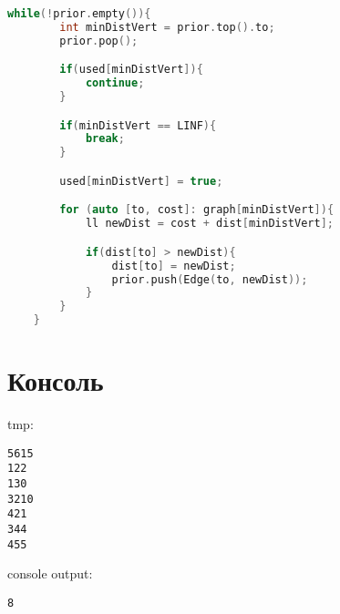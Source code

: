 \begin{lstlisting}[language=C++]
    while(!prior.empty()){
        int minDistVert = prior.top().to;
        prior.pop();

        if(used[minDistVert]){
            continue;
        }

        if(minDistVert == LINF){
            break;
        }        

        used[minDistVert] = true;

        for (auto [to, cost]: graph[minDistVert]){
            ll newDist = cost + dist[minDistVert];

            if(dist[to] > newDist){
                dist[to] = newDist;
                prior.push(Edge(to, newDist));
            }
        }
    }
\end{lstlisting}

\section{Консоль}
tmp:
\begin{alltt}
5 6 1 5
1 2 2
1 3 0
3 2 10
4 2 1
3 4 4
4 5 5
\end{alltt}
console output:
\begin{alltt}
8
\end{alltt}
\pagebreak
